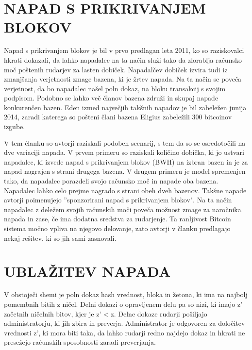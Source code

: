 \documentclass{acm_proc_article-sp}
\begin{document}
\section{NAPAD S PRIKRIVANJEM BLOKOV} \label{sekcija2}

Napad s prikrivanjem blokov je bil v prvo predlagan leta 2011, ko so raziskovalci hkrati dokazali, da lahko napadalec na ta način služi tako da zlorablja računsko moč poštenih rudarjev za lasten dobiček. Napadalčev dobiček izvira tudi iz zmanjšanja verjetnosti zmage bazena, ki je žrtev napada. Na ta način se poveča verjetnost, da bo napadalec našel poln dokaz, na bloku transakcij s svojim podpisom. Podobno se lahko več članov bazena združi in skupaj napade konkurenčen bazen. Eden izmed največjih takšnih napadov je bil zabeležen junija 2014, zaradi katerega so pošteni člani bazena Eligius zabeležili 300 bitcoinov izgube.

V tem članku so avtorji raziskali podoben scenarij, s tem da so se osredotočili na dve variaciji napada. V prvem primeru so raziskali količino dobička, ki jo ustvari napadalec, ki izvede napad s prikrivanjem blokov (BWH) na izbran bazen in je za napad nagrajen s strani drugega bazena. V drugem primeru je model spremenjen tako, da napadalec porazdeli svojo računsko moč in napade oba bazena. Napadalec lahko celo prejme nagrado s strani obeh dveh bazenov. Takšne napade avtorji poimenujejo ''sponzorirani napad s prikrivanjem blokov". Na ta način napadalec z deležem svojih računskih moči poveča možnost zmage za naročnika napada in zase, če ima dodatna sredstva za rudarjenje.  Ta ranljivost Bitcoin sistema močno vpliva na njegovo delovanje, zato avtorji v članku predlagajo nekaj rešitev, ki so jih sami zasnovali.

\section{UBLAŽITEV NAPADA} \label{sekcija3}

V obstoječi shemi je poln dokaz hash vrednost, bloka in žetona, ki ima na najbolj pomembnih bitih z ničel. Delni dokazi o opravljenem delu pa so nizi, ki imajo z' začetnih ničelnih bitov, kjer je z' < z.
Delne dokaze rudarji pošiljajo administratorju, ki jih zbira in preverja. Administrator je odgovoren za določitev vrednosti z', ki mora biti taka, da lahko rudarji redno najdejo dokaz in hkrati ne presežejo računskih sposobnosti zaradi preverjanja.
 
\end{document}
